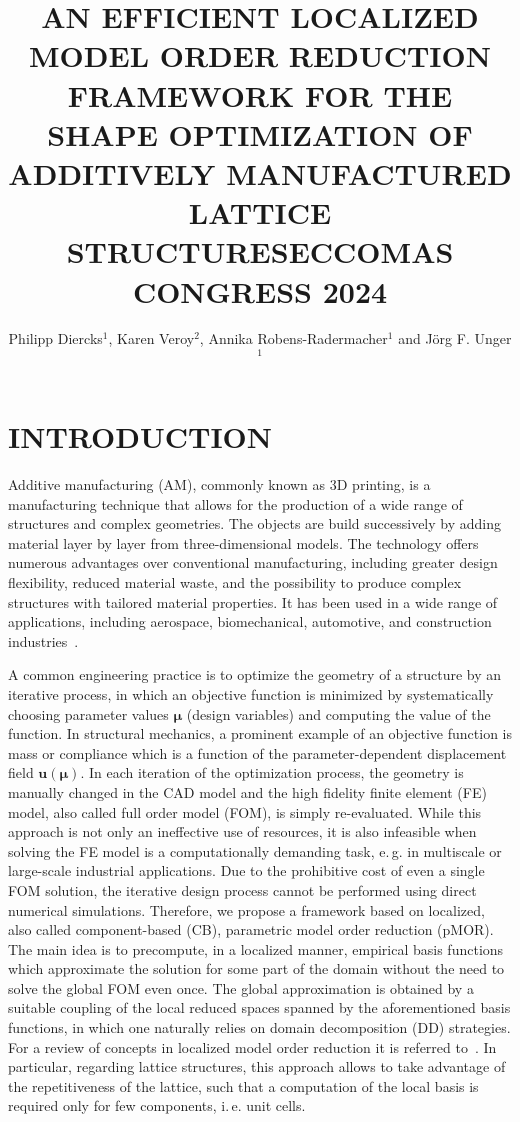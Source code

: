 \documentclass[a4paper]{eccomas_paper-2024}
\title{AN EFFICIENT LOCALIZED MODEL ORDER REDUCTION FRAMEWORK FOR THE SHAPE OPTIMIZATION OF ADDITIVELY MANUFACTURED LATTICE STRUCTURES\break ECCOMAS CONGRESS 2024}
\author{Philipp Diercks$^{1}$, Karen Veroy$^{2}$, Annika Robens-Radermacher$^{1}$ and Jörg F. Unger$^{1}$}
\makeatletter
\newcommand{\ie}{i.\,e.\@\xspace}
\newcommand{\eg}{e.\,g.\@\xspace}
\makeatother
\begin{document}
\thispagestyle{empty}

\section{INTRODUCTION}%
\label{sec:introduction}

Additive manufacturing (AM), commonly known as 3D printing, is a manufacturing technique that allows for the production of a wide range of structures and complex geometries.
The objects are build successively by adding material layer by layer from three-dimensional models.
The technology offers numerous advantages over conventional manufacturing, including greater design flexibility, reduced material waste, and the possibility to produce complex structures with tailored material properties.
It has been used in a wide range of applications, including aerospace, biomechanical, automotive, and construction industries~\cite{Plessis2022Properties,Wu2016critical}.

A common engineering practice is to optimize the geometry of a structure by an iterative process, in which an objective function is minimized by systematically choosing parameter values $\bm\mu$ (design variables) and computing the value of the function.
In structural mechanics, a prominent example of an objective function is mass or compliance which is a function of the parameter-dependent displacement field $\bm{u}(\bm\mu)$.
In each iteration of the optimization process, the geometry is manually changed in the CAD model and the high fidelity finite element (FE) model, also called full order model (FOM), is simply re-evaluated.
While this approach is not only an ineffective use of resources, it is also infeasible when solving the FE model is a computationally demanding task, \eg{} in multiscale or large-scale industrial applications.
Due to the prohibitive cost of even a single FOM solution, the iterative design process cannot be performed using direct numerical simulations.
Therefore, we propose a framework based on localized, also called component-based (CB), parametric model order reduction (pMOR).
The main idea is to precompute, in a localized manner, empirical basis functions which approximate the solution for some part of the domain without the need to solve the global FOM even once.
The global approximation is obtained by a suitable coupling of the local reduced spaces spanned by the aforementioned basis functions, in which one naturally relies on domain decomposition (DD) strategies.
For a review of concepts in localized model order reduction it is referred to~\cite{BuhrReview}.
In particular, regarding lattice structures, this approach allows to take advantage of the repetitiveness of the lattice, such that a computation of the local basis is required only for few components, \ie{} unit cells.
\end{document}
